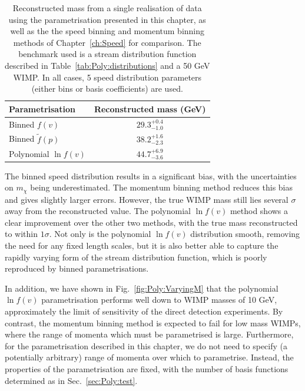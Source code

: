 \begin{table}[t]
  \setlength{\extrarowheight}{5pt}
  \begin{center}
	\begin{tabular}{lc}
         \hline\hline
	 Parametrisation & Reconstructed mass (GeV) \\
	 \hline
	 Binned $f(v)$ & \(29.3^{+0.4}_{-1.0}\) \\
	 Binned $\tilde{f}(p)$ & \(38.2^{+1.6}_{-2.3}\)\\
	 Polynomial $\ln f(v)$ & \(44.7^{+6.9}_{-3.6}\) \\
         \hline\hline
	\end{tabular}
  \end{center}
  \caption[Comparison of WIMP mass reconstruction using the speed binning, momentum binning and polynomial $\ln f(v)$ parametrisations]{Reconstructed mass from a single realisation of data using the parametrisation presented in this chapter, as well as the the speed binning and momentum binning methods of Chapter~\ref{ch:Speed} for comparison. The benchmark used is a stream distribution function described in Table~\ref{tab:Poly:distributions} and a 50 GeV WIMP. In all cases, 5 speed distribution parameters (either bins or basis coefficients) are used.}
\label{tab:Poly:ReconstructedMass}
\end{table}

The binned speed distribution results in a significant bias, with the uncertainties on $m_\chi$ being underestimated. The momentum binning method reduces this bias and gives slightly larger errors. However, the true WIMP mass still lies several $\sigma$ away from the reconstructed value. The polynomial $\ln f(v)$ method shows a clear improvement over the other two methods, with the true mass reconstructed to within $1\sigma$. Not only is the polynomial $\ln f(v)$ distribution smooth, removing the need for any fixed length scales, but it is also better able to capture the rapidly varying form of the stream distribution function, which is poorly reproduced by binned parametrisations.

In addition, we have shown in Fig.~\ref{fig:Poly:VaryingM} that the polynomial $\ln f(v)$ parametrisation performs well down to WIMP masses of 10 GeV, approximately the limit of sensitivity of the direct detection experiments. By contrast, the momentum binning method is expected to fail for low mass WIMPs, where the range of momenta which must be parametrised is large. Furthermore, for the parametrisation described in this chapter, we do not need to specify (a potentially arbitrary) range of momenta over which to parametrise. Instead, the properties of the parametrisation are fixed, with the number of basis functions determined as in Sec.~\ref{sec:Poly:test}.

